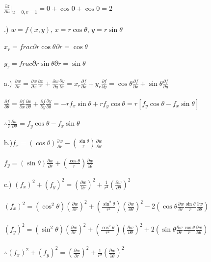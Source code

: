 \documentclass[12pt]{article}
\begin{document}
\noindent $\frac{\partial z}{\partial u} \Big|_{u = 0, v=1} = 0+\cos{0} + \cos{0} = 2$\\\\



.) $w = f(x,y)$, \hspace{10pt} $x = r\cos{\theta}$, \hspace{10pt} $y = r\sin{\theta}$\\\\
\noindent $x_{r} = frac{\partial r\cos{\theta}}{\partial r} = \cos{\theta}$\\\\
\noindent $y_{r} = frac{\partial r\sin{\theta}}{\partial r} = \sin{\theta}$\\\\
\noindent a.) $\frac{\partial w}{\partial r} = \frac{\partial w}{\partial x}\frac{\partial x}{r} + \frac{\partial w}{\partial y}\frac{\partial y}{\partial r} = x_{r}\frac{\partial f}{\partial x} + y_{r}\frac{\partial f}{\partial y} = \cos{\theta}\frac{\partial f}{\partial x} + \sin{\theta}\frac{\partial f}{\partial y}$
\\\\$\frac{\partial f}{\partial \theta} = \frac{\partial f}{\partial x}\frac{\partial x}{\partial \theta} + \frac{\partial f}{\partial y}\frac{\partial y}{\partial \theta} = -rf_{x}\sin{\theta} + rf_{y}\cos{\theta} = r[f_{y}\cos{\theta} - f_{x}\sin{\theta}]$\\\\
\noindent $\therefore \frac{1}{r}\frac{\partial w}{\partial \theta} = f_{y}\cos{\theta} - f_{x}\sin{\theta}$\\\\
\noindent b.)$f_{x} = (\cos{\theta})\frac{\partial w}{\partial r}-(\frac{\sin{\theta}}{r})\frac{\partial w}{\partial \theta}$\\\\
$f_{y} = (\sin{\theta})\frac{\partial w}{\partial r} + (\frac{\cos{\theta}}{r})\frac{\partial w}{\partial \theta}$\\\\

\noindent c.) $(f_{x})^{2} + (f_{y})^{2} = (\frac{\partial w}{\partial r})^{2} + \frac{1}{r^{2}}(\frac{\partial w}{\partial \theta})^{2}$\\\\
\noindent $(f_{x})^{2} = (\cos^{2}{\theta})(\frac{\partial w}{\partial r})^{2} + (\frac{\sin^{2}{\theta}}{r^{2}})(\frac{\partial w}{\partial \theta})^{2} - 2(\cos{\theta}\frac{\partial w}{\partial r}\frac{\sin{\theta}}{r}\frac{\partial w}{\partial \theta})$\\\\
\noindent $(f_{y})^{2} = (\sin^{2}{\theta})(\frac{\partial w}{\partial r})^{2} + (\frac{\cos^{2}{\theta}}{r^{2}})(\frac{\partial w}{\partial \theta})^{2} + 2(\sin{\theta}\frac{\partial w}{\partial r}\frac{\cos{\theta}}{r}\frac{\partial w}{\partial \theta})$\\\\
\noindent $\therefore (f_{x})^{2} + (f_{y})^{2} = (\frac{\partial w}{\partial r})^{2} + \frac{1}{r^{2}}(\frac{\partial w}{\partial \theta})^{2}$\\\\ 
\end{document}
